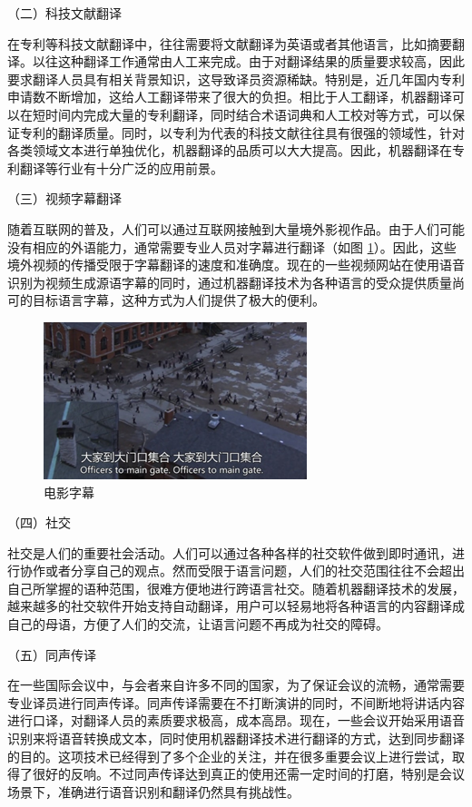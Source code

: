 \parinterval （二）科技文献翻译

\parinterval 在专利等科技文献翻译中，往往需要将文献翻译为英语或者其他语言，比如摘要翻译。以往这种翻译工作通常由人工来完成。由于对翻译结果的质量要求较高，因此要求翻译人员具有相关背景知识，这导致译员资源稀缺。特别是，近几年国内专利申请数不断增加，这给人工翻译带来了很大的负担。相比于人工翻译，机器翻译可以在短时间内完成大量的专利翻译，同时结合术语词典和人工校对等方式，可以保证专利的翻译质量。同时，以专利为代表的科技文献往往具有很强的领域性，针对各类领域文本进行单独优化，机器翻译的品质可以大大提高。因此，机器翻译在专利翻译等行业有十分广泛的应用前景。

\parinterval （三）视频字幕翻译

\parinterval 随着互联网的普及，人们可以通过互联网接触到大量境外影视作品。由于人们可能没有相应的外语能力，通常需要专业人员对字幕进行翻译（如图
\ref{fig:1-13}）。因此，这些境外视频的传播受限于字幕翻译的速度和准确度。现在的一些视频网站在使用语音识别为视频生成源语字幕的同时，通过机器翻译技术为各种语言的受众提供质量尚可的目标语言字幕，这种方式为人们提供了极大的便利。

\begin{figure}[htp]
    \centering
\includegraphics[scale=1.2]{./Chapter1/Figures/figure-film-subtitles.jpg}
    \caption{电影字幕}
    \label{fig:1-13}
\end{figure}

\parinterval （四）社交

\parinterval 社交是人们的重要社会活动。人们可以通过各种各样的社交软件做到即时通讯，进行协作或者分享自己的观点。然而受限于语言问题，人们的社交范围往往不会超出自己所掌握的语种范围，很难方便地进行跨语言社交。随着机器翻译技术的发展，越来越多的社交软件开始支持自动翻译，用户可以轻易地将各种语言的内容翻译成自己的母语，方便了人们的交流，让语言问题不再成为社交的障碍。

\parinterval （五）同声传译

\parinterval 在一些国际会议中，与会者来自许多不同的国家，为了保证会议的流畅，通常需要专业译员进行同声传译。同声传译需要在不打断演讲的同时，不间断地将讲话内容进行口译，对翻译人员的素质要求极高，成本高昂。现在，一些会议开始采用语音识别来将语音转换成文本，同时使用机器翻译技术进行翻译的方式，达到同步翻译的目的。这项技术已经得到了多个企业的关注，并在很多重要会议上进行尝试，取得了很好的反响。不过同声传译达到真正的使用还需一定时间的打磨，特别是会议场景下，准确进行语音识别和翻译仍然具有挑战性。

